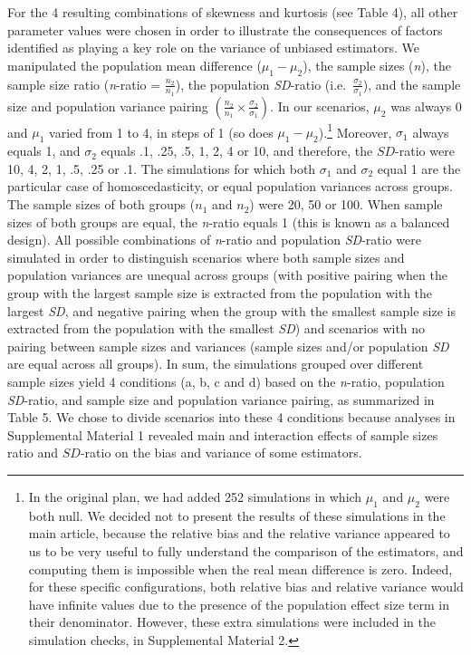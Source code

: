 \documentclass[
  english,
  man]{apa6}
\begin{document}
For the 4 resulting combinations of skewness and kurtosis (see Table 4), all other parameter values were chosen in order to illustrate the consequences of factors identified as playing a key role on the variance of unbiased estimators. We manipulated the population mean difference (\(\mu_1-\mu_2\)), the sample sizes (\emph{n}), the sample size ratio (\emph{n}-ratio = \(\frac{n_2}{n_1}\)), the population \emph{SD}-ratio (i.e.~\(\frac{\sigma_2}{\sigma_1}\)), and the sample size and population variance pairing \(\left(\frac{n_2}{n_1}\times\frac{\sigma_2}{\sigma_1} \right)\). In our scenarios, \(\mu_2\) was always 0 and \(\mu_1\) varied from 1 to 4, in steps of 1 (so does \(\mu_1-\mu_2\)).\footnote{In the original plan, we had added 252 simulations in which $\mu_1$ and $\mu_2$ were both null. We decided not to present the results of these simulations in the main article, because the relative bias and the relative variance appeared to us to be very useful to fully understand the comparison of the estimators, and computing them is impossible when the real mean difference is zero. Indeed, for these specific configurations, both relative bias and relative variance would have infinite values due to the presence of the population effect size term in their denominator. However, these extra simulations were included in the simulation checks, in Supplemental Material 2. } Moreover, \(\sigma_1\) always equals 1, and \(\sigma_2\) equals .1, .25, .5, 1, 2, 4 or 10, and therefore, the \(SD\)-ratio were 10, 4, 2, 1, .5, .25 or .1. The simulations for which both \(\sigma_1\) and \(\sigma_2\) equal 1 are the particular case of homoscedasticity, or equal population variances across groups. The sample sizes of both groups (\(n_1\) and \(n_2\)) were 20, 50 or 100. When sample sizes of both groups are equal, the \emph{n}-ratio equals 1 (this is known as a balanced design). All possible combinations of \emph{n}-ratio and population \emph{SD}-ratio were simulated in order to distinguish scenarios where both sample sizes and population variances are unequal across groups (with positive pairing when the group with the largest sample size is extracted from the population with the largest \emph{SD}, and negative pairing when the group with the smallest sample size is extracted from the population with the smallest \emph{SD}) and scenarios with no pairing between sample sizes and variances (sample sizes and/or population \emph{SD} are equal across all groups). In sum, the simulations grouped over different sample sizes yield 4 conditions (a, b, c and d) based on the \emph{n}-ratio, population \emph{SD}-ratio, and sample size and population variance pairing, as summarized in Table 5. We chose to divide scenarios into these 4 conditions because analyses in Supplemental Material 1 revealed main and interaction effects of sample sizes ratio and \(SD\)-ratio on the bias and variance of some estimators.
\end{document}
